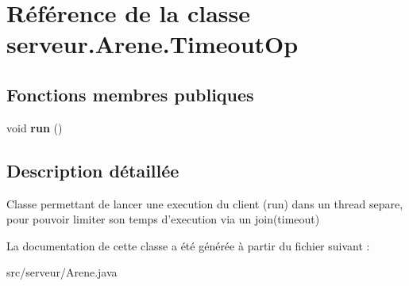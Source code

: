 \hypertarget{classserveur_1_1_arene_1_1_timeout_op}{\section{Référence de la classe serveur.\-Arene.\-Timeout\-Op}
\label{classserveur_1_1_arene_1_1_timeout_op}
}
\subsection*{Fonctions membres publiques}
\begin{DoxyCompactItemize}
\item 
\hypertarget{classserveur_1_1_arene_1_1_timeout_op_a717da5dace60a4deb7707b5513909cfd}{void {\bfseries run} ()}\label{classserveur_1_1_arene_1_1_timeout_op_a717da5dace60a4deb7707b5513909cfd}

\end{DoxyCompactItemize}


\subsection{Description détaillée}
Classe permettant de lancer une execution du client (run) dans un thread separe, pour pouvoir limiter son temps d'execution via un join(timeout) 

La documentation de cette classe a été générée à partir du fichier suivant \-:\begin{DoxyCompactItemize}
\item 
src/serveur/Arene.\-java\end{DoxyCompactItemize}
